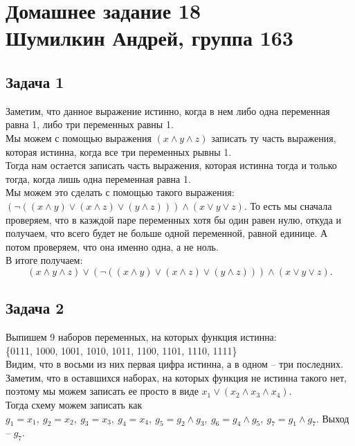

	\section{Домашнее задание 18\\ Шумилкин Андрей, группа 163} 
	\subsection{Задача 1}
	Заметим, что данное выражение истинно, когда в нем либо одна переменная равна 1, либо три переменных равны 1. \\
	Мы можем с помощью выражения $(x \land y \land z)$  записать ту часть выражения, которая истинна, когда все три переменных рывны 1. \\
	Тогда нам остается записать часть выражения, которая истинна тогда и только тогда, когда лишь одна переменная равна 1. \\
	Мы можем это сделать с помощью такого выражения: $(\lnot((x \land y) \lor (x \land z) \lor (y \land z)))\land (x \lor y \lor z)$. То есть мы сначала проверяем, что в каэждой паре переменных хотя бы один равен нулю, откуда и получаем, что всего будет не больше одной переменной, равной единице. А потом проверяем, что она именно одна, а не ноль. \\
	В итоге получаем: 
	\[
		(x \land y \land z) \lor (\lnot((x \land y) \lor (x \land z) \lor (y \land z)))\land (x \lor y \lor z).
	\]
	
	\subsection{Задача 2}
	Выпишем 9 наборов переменных, на которых функция истинна: \\
	\{0111, 1000, 1001, 1010, 1011, 1100, 1101, 1110, 1111\} \\
	Видим, что в восьми из них первая цифра истинна, а в одном -- три последних. Заметим, что в оставшихся наборах, на которых функция не истинна такого нет, поэтому мы можем записать ее просто в виде $x_1 \lor (x_2 \land x_3 \land x_4)$. \\
	Тогда схему можем записать как $g_1 = x_1,\ g_2 = x_2,\ g_3 = x_3,\ g_4 = x_4,\ g_ 5 = g_2 \land g_3,\ g_6 = g_4 \land g_5,\ g_7 = g_1 \land g_7$. Выход -- $g_7$.
	
